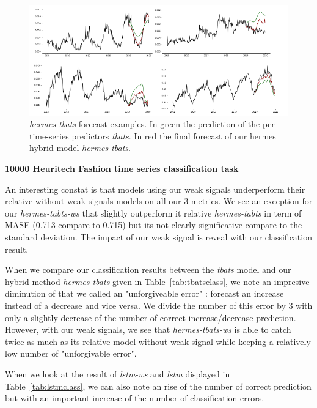 \documentclass{article} %
\begin{document}
\begin{figure}
  \centering
    \includegraphics[width=1.\linewidth]{figure/hybrid_model_examples}
  \caption{\textit{hermes-tbats} forecast examples. In green the prediction of the per-time-series predictors \textit{tbats}. In red the final forecast of our hermes hybrid model \textit{hermes-tbats}.}
\label{fig:hybrid-examples}
\end{figure}


\textbf{10000 Heuritech Fashion time series classification task}

An interesting constat is that models using our weak signals underperform their relative without-weak-signals models on all our 3 metrics. We see an exception for our \textit{hermes-tabts-ws} that slightly outperform it relative \textit{hermes-tabts} in term of MASE (0.713 compare to 0.715) but its not clearly significative compare to the standard deviation. The impact of our weak signal is reveal with our classification result.

When we compare our classification results between the \textit{tbats} model and our hybrid method \textit{hermes-tbats} given in Table~\ref{tab:tbatsclass}, we note an impresive diminution of that we called an "unforgiveable error" : forecast an increase instead of a decrease and vice versa. We divide the number of this error by 3 with only a slightly decrease of the number of correct increase/decrease prediction. However, with our weak signals, we see that \textit{hermes-tbats-ws} is able to catch twice as much as its relative model without weak signal while keeping a relatively low number of "unforgivable error".

When we look at the result of \textit{lstm-ws} and \textit{lstm} displayed in Table~\ref{tab:lstmclass}, we can also note an rise of the number of correct prediction but with an important increase of the number of classification errors.
\end{document}
